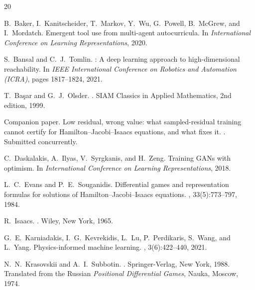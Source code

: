\documentclass[twoside,11pt]{article}
\begin{document}

\begin{thebibliography}{20}

B.~Baker, I.~Kanitscheider, T.~Markov, Y.~Wu, G.~Powell, B.~McGrew,
and I.~Mordatch.
\newblock Emergent tool use from multi-agent autocurricula.
\newblock In {\em International Conference on Learning
Representations}, 2020.

S.~Bansal and C.~J.~Tomlin.
: A deep learning approach to high-dimensional
reachability.
\newblock In {\em IEEE International Conference on Robotics and
Automation (ICRA)}, pages 1817--1824, 2021.

T.~Ba\c{s}ar and G.~J.~Olsder.
.
\newblock SIAM Classics in Applied Mathematics, 2nd edition, 1999.

Companion paper.
\newblock Low residual, wrong value: what sampled-residual training
cannot certify for {Hamilton--Jacobi--Isaacs} equations, and what fixes it.
.  Submitted concurrently.

C.~Daskalakis, A.~Ilyas, V.~Syrgkanis, and H.~Zeng.
\newblock Training {GANs} with optimism.
\newblock In {\em International Conference on Learning
Representations}, 2018.

L.~C.~Evans and P.~E.~Souganidis.
\newblock Differential games and representation formulas for
solutions of {Hamilton--Jacobi--Isaacs} equations.
,
33(5):773--797, 1984.

R.~Isaacs.
.
\newblock Wiley, New York, 1965.

G.~E.~Karniadakis, I.~G.~Kevrekidis, L.~Lu, P.~Perdikaris, S.~Wang,
and L.~Yang.
\newblock Physics-informed machine learning.
, 3(6):422--440, 2021.

N.~N.~Krasovskii and A.~I.~Subbotin.
.
\newblock Springer-Verlag, New York, 1988.
\newblock Translated from the Russian {\em Positional Differential
Games}, Nauka, Moscow, 1974.


\end{thebibliography}
\end{document}
